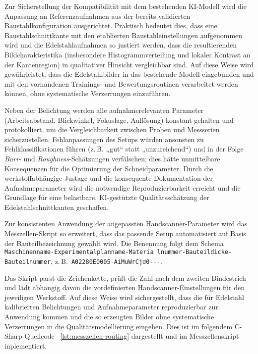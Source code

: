 Zur Sicherstellung der Kompatibilität mit dem bestehenden KI-Modell wird die Anpassung an Referenzaufnahmen aus der bereits validierten Baustahlkonfiguration ausgerichtet. Praktisch bedeutet dies, dass eine Baustahlschnittkante mit den etablierten Baustahleinstellungen aufgenommen wird und die Edelstahlaufnahmen so justiert werden, dass die resultierenden Bildcharakteristika (insbesondere Histogrammverteilung und lokaler Kontrast an der Kantenregion) in qualitativer Hinsicht vergleichbar sind. Auf diese Weise wird gewährleistet, dass die Edelstahlbilder in das bestehende Modell eingebunden und mit den vorhandenen Trainings- und Bewertungsroutinen verarbeitet werden können, ohne systematische Verzerrungen einzuführen.

Neben der Belichtung werden alle aufnahmerelevanten Parameter (Arbeitsabstand, Blickwinkel, Fokuslage, Auflösung) konstant gehalten und protokolliert, um die Vergleichbarkeit zwischen Proben und Messserien sicherzustellen. Fehlanpassungen des Setups würden ansonsten zu Fehlklassifikationen führen (z.\,B. „gut“ statt „unzureichend“) und in der Folge \emph{Burr}- und \emph{Roughness}-Schätzungen verfälschen; dies hätte unmittelbare Konsequenzen für die Optimierung der Schneidparameter. Durch die werkstoffabhängige Justage und die konsequente Dokumentation der Aufnahmeparameter wird die notwendige Reproduzierbarkeit erreicht und die Grundlage für eine belastbare, KI-gestützte Qualitätsschätzung der Edelstahlschnittkanten geschaffen.

Zur konsistenten Anwendung der angepassten Handscanner-Parameter wird das Messzellen-Skript so erweitert, dass das passende Setup automatisiert auf Basis der Bauteilbezeichnung gewählt wird. Die Benennung folgt dem Schema
\texttt{Maschinenname-\allowbreak Experimentalplanname-\allowbreak Materia
lnummer-\allowbreak Bauteildicke-\allowbreak Bauteilnummer},
z.\,B.\ \texttt{A02280E0005-\allowbreak AiMuWrCjd0---}.

Das Skript parst die Zeichenkette, prüft die Zahl nach dem zweiten Bindestrich und lädt abhängig davon die vordefinierten Handscanner-Einstellungen für den jeweiligen Werkstoff. Auf diese Weise wird sichergestellt, dass die für Edelstahl kalibrierten Belichtungen und Aufnahmeparameter reproduzierbar zur Anwendung kommen und die so erzeugten Bilder ohne systematische Verzerrungen in die Qualitätsmodellierung eingehen. Dies ist im folgendem C-Sharp Quellcode ~\ref{lst:messzellen-routing} dargestellt und im Messzellenskript inplementiert.

